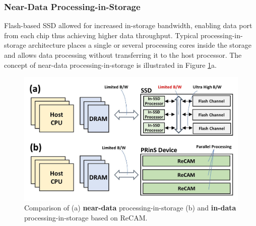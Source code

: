 \documentclass{superfri}
\begin{document}
	\subsubsection{Near-Data Processing-in-Storage}
	\label{sec:NDP_PRinS}
	Flash-based SSD allowed for increased in-storage bandwidth, enabling data port from each chip thus achieving higher data throughput. Typical processing-in-storage architecture places a single or several processing cores inside the storage and allows data processing without transferring it to the host processor. The concept of near-data processing-in-storage is illustrated in Figure \ref{fig:in_vs_near_data}a. 
	
	\begin{figure}[h!]
		\centerline{\includegraphics[scale=0.8]{Figures/In_vs_near_data.jpg}}
		\caption{Comparison of (a) \textbf{near-data} processing-in-storage (b) and \textbf{in-data} processing-in-storage based on ReCAM.}
		\label{fig:in_vs_near_data}
	\end{figure}
	
\end{document}

